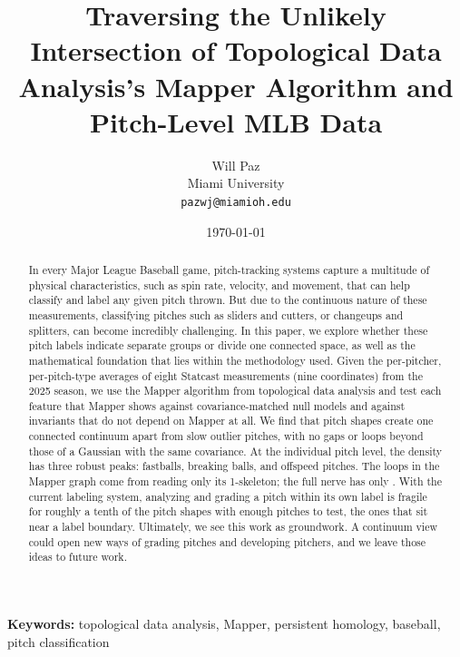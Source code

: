\documentclass[11pt]{article}
\title{Traversing the Unlikely Intersection of Topological Data Analysis's Mapper Algorithm and Pitch-Level MLB Data}
\author{Will Paz\\ Miami University\\ \texttt{pazwj@miamioh.edu}}
\date{\today}
\theoremstyle{definition}
\theoremstyle{remark}
\begin{document}
\maketitle

\begin{abstract}
In every Major League Baseball game, pitch-tracking systems capture a multitude of physical characteristics, such as spin rate, velocity, and movement, that can help classify and label any given pitch thrown.
But due to the continuous nature of these measurements, classifying pitches such as sliders and cutters, or changeups and splitters, can become incredibly challenging.
In this paper, we explore whether these pitch labels indicate separate groups or divide one connected space, as well as the mathematical foundation that lies within the methodology used.
Given the \NShapes{} per-pitcher, per-pitch-type averages of eight Statcast measurements (nine coordinates) from the 2025 season, we use the Mapper algorithm from topological data analysis and test each feature that Mapper shows against covariance-matched null models and against invariants that do not depend on Mapper at all.
We find that pitch shapes create one connected continuum apart from slow outlier pitches, with no gaps or loops beyond those of a Gaussian with the same covariance.
At the individual pitch level, the density has three robust peaks: fastballs, breaking balls, and offspeed pitches.
The \GraphBone{} loops in the Mapper graph come from reading only its 1-skeleton; the full nerve has only \NerveBone.
With the current labeling system, analyzing and grading a pitch within its own label is fragile for roughly a tenth of the pitch shapes with enough pitches to test, the ones that sit near a label boundary.
Ultimately, we see this work as groundwork. A continuum view could open new ways of grading pitches and developing pitchers, and we leave those ideas to future work.
\end{abstract}
\noindent\textbf{Keywords:} topological data analysis, Mapper, persistent homology, baseball, pitch classification

\end{document}
